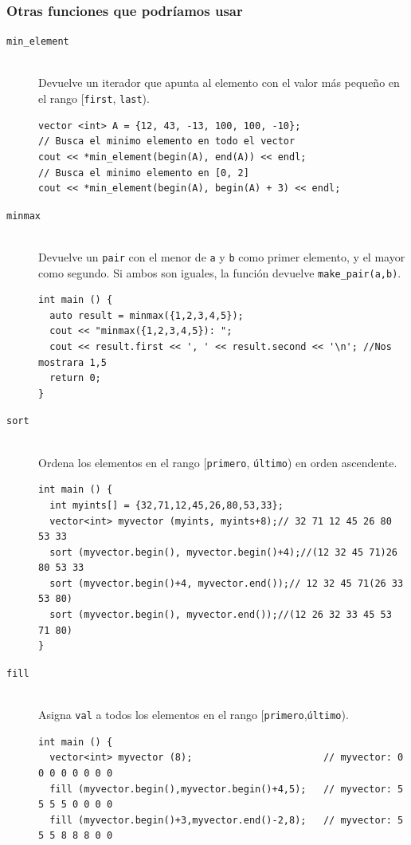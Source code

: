 \documentclass[a4paper,12pt]{article}
\begin{document}
\subsubsection*{Otras funciones que podríamos usar}
\begin{description}
\item[\texttt{min\_element}] \hfill \\Devuelve un iterador que apunta al elemento con el valor más pequeño en el rango [\texttt{first}, \texttt{last}).
\begin{lstlisting}
vector <int> A = {12, 43, -13, 100, 100, -10};
// Busca el minimo elemento en todo el vector
cout << *min_element(begin(A), end(A)) << endl;
// Busca el minimo elemento en [0, 2]
cout << *min_element(begin(A), begin(A) + 3) << endl;
\end{lstlisting}
\item[\texttt{minmax}] \hfill \\ Devuelve un \texttt{pair} con el menor de \texttt{a} y \texttt{b} como primer elemento, y el mayor como segundo. Si ambos son iguales, la función devuelve \texttt{make\_pair(a,b)}.
\begin{lstlisting}
int main () {
  auto result = minmax({1,2,3,4,5});
  cout << "minmax({1,2,3,4,5}): ";
  cout << result.first << ', ' << result.second << '\n'; //Nos mostrara 1,5
  return 0;
}
\end{lstlisting}
\item[\texttt{sort}] \hfill \\ Ordena los elementos en el rango [\texttt{primero}, \texttt{último}) en orden ascendente.
\begin{lstlisting}
int main () {
  int myints[] = {32,71,12,45,26,80,53,33};
  vector<int> myvector (myints, myints+8);// 32 71 12 45 26 80 53 33
  sort (myvector.begin(), myvector.begin()+4);//(12 32 45 71)26 80 53 33
  sort (myvector.begin()+4, myvector.end());// 12 32 45 71(26 33 53 80)
  sort (myvector.begin(), myvector.end());//(12 26 32 33 45 53 71 80)
}
\end{lstlisting}
\item[\texttt{fill}] \hfill \\ Asigna \texttt{val} a todos los elementos en el rango [\texttt{primero},\texttt{último}).
\begin{lstlisting}
int main () {
  vector<int> myvector (8);                       // myvector: 0 0 0 0 0 0 0 0
  fill (myvector.begin(),myvector.begin()+4,5);   // myvector: 5 5 5 5 0 0 0 0
  fill (myvector.begin()+3,myvector.end()-2,8);   // myvector: 5 5 5 8 8 8 0 0

\end{lstlisting}
\end{description}
\end{document}
